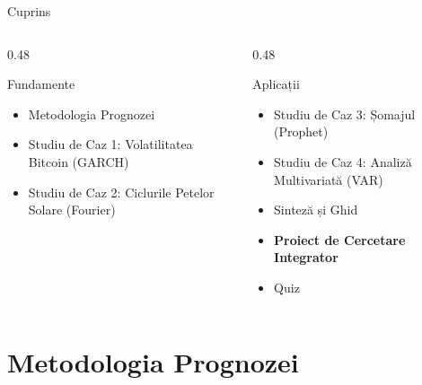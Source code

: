 \documentclass[9pt, aspectratio=169, t]{beamer}
\begin{document}
\begin{frame}{Cuprins}
    \vspace{-0.2cm}
    {\small
    \begin{columns}[T]
        \begin{column}{0.48\textwidth}
            \begin{block}{Fundamente}
                \begin{itemize}\setlength{\itemsep}{3pt}
                    \item Metodologia Prognozei
                    \item Studiu de Caz 1: Volatilitatea Bitcoin (GARCH)
                    \item Studiu de Caz 2: Ciclurile Petelor Solare (Fourier)
                \end{itemize}
            \end{block}
        \end{column}
        \begin{column}{0.48\textwidth}
            \begin{exampleblock}{Aplicații}
                \begin{itemize}\setlength{\itemsep}{3pt}
                    \item Studiu de Caz 3: Șomajul (Prophet)
                    \item Studiu de Caz 4: Analiză Multivariată (VAR)
                    \item Sinteză și Ghid
                    \item \textbf{Proiect de Cercetare Integrator}
                    \item Quiz
                \end{itemize}
            \end{exampleblock}
        \end{column}
    \end{columns}
    }
\end{frame}

\section{Metodologia Prognozei}
\end{document}
